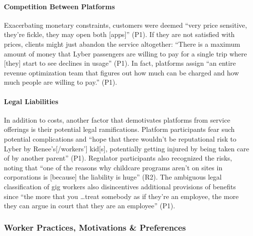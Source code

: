 \paragraph{Competition Between Platforms}
Exacerbating monetary constraints, customers were deemed ``very price sensitive, they're fickle, they may open both [apps]'' (P1). If they are not satisfied with prices, clients might just abandon the service altogether: ``There is a maximum amount of money that Lyber passengers are willing to pay for a single trip where [they] start to see declines in usage'' (P1). In fact, platforms assign ``an entire revenue optimization team that figures out how much can be charged and how much people are willing to pay.'' (P1).


\paragraph{Legal Liabilities} 
In addition to costs, another factor that demotivates platforms from service offerings is their potential legal ramifications. Platform participants fear such potential complications and ``hope that there wouldn't be reputational risk to Lyber by Renee's[/workers'] kid[s], potentially getting injured by being taken care of by another parent'' (P1). Regulator participants also recognized the risks, noting that ``one of the reasons why childcare programs aren't on sites in corporations is [because] the liability is huge'' (R2). 
The ambiguous legal classification of gig workers also disincentives additional provisions of benefits since ``the more that you \dots treat somebody as if they're an employee, the more they can argue in court that they are an employee'' (P1). 


\subsubsection{Worker Practices, Motivations \& Preferences}
